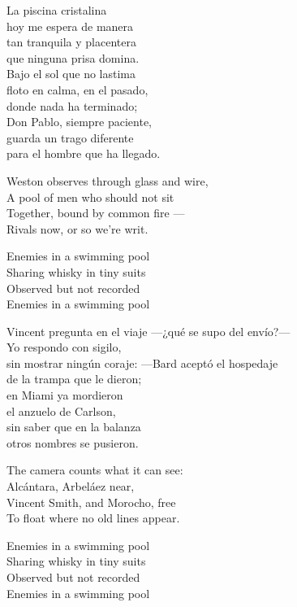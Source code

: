 \begin{lyrics}
La piscina cristalina\\
hoy me espera de manera\\
tan tranquila y placentera\\
que ninguna prisa domina.\\
Bajo el sol que no lastima\\
floto en calma, en el pasado,\\
donde nada ha terminado;\\
Don Pablo, siempre paciente,\\
guarda un trago diferente\\
para el hombre que ha llegado.

Weston observes through glass and wire,\\
A pool of men who should not sit\\
Together, bound by common fire —\\
Rivals now, or so we're writ.

Enemies in a swimming pool\\
Sharing whisky in tiny suits\\
Observed but not recorded\\
Enemies in a swimming pool

Vincent pregunta en el viaje
—¿qué se supo del envío?—\\
Yo respondo con sigilo,\\
sin mostrar ningún coraje:
—Bard aceptó el hospedaje\\
de la trampa que le dieron;\\
en Miami ya mordieron\\
el anzuelo de Carlson,\\
sin saber que en la balanza\\
otros nombres se pusieron.

The camera counts what it can see:\\
Alcántara, Arbeláez near,\\
Vincent Smith, and Morocho, free\\
To float where no old lines appear.

Enemies in a swimming pool\\
Sharing whisky in tiny suits\\
Observed but not recorded\\
Enemies in a swimming pool


\end{lyrics}
